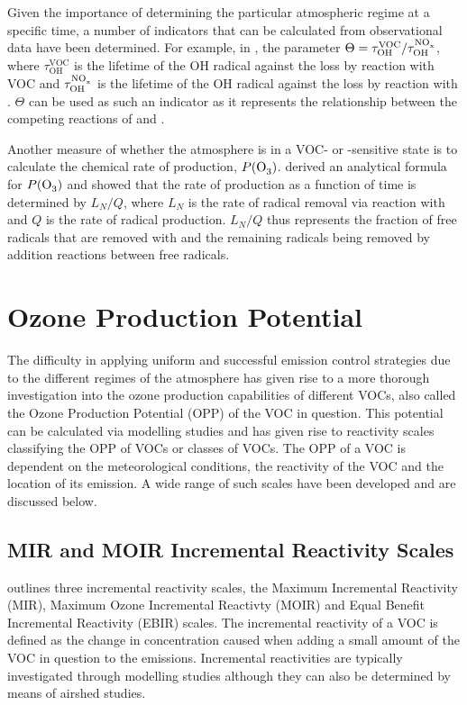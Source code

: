 Given the importance of determining the particular atmospheric regime at a specific time, a number of indicators that can be 
calculated from observational data have been determined. For example, in \citep{Kirchner:2001}, the parameter 
$\Theta = \tau^{\text{VOC}}_{\text{OH}} / \tau^{\ce{NO_x}}_{\text{OH}}$, where $\tau^{\text{VOC}}_{\text{OH}}$ is the lifetime 
of the OH radical against the loss by reaction with VOC and $\tau^{\ce{NO_x}}_{\text{OH}}$ is the lifetime of the OH radical 
against the loss by reaction with . $\Theta$ can be used as such an indicator as it represents the relationship 
between the competing reactions of  and .

Another measure of whether the atmosphere is in a VOC- or -sensitive state is to calculate the chemical rate of 
 production, $P(\ce{O3})$. \citep{Kleinman:2005} derived an analytical formula for $P(\ce{O3})$ and showed that the rate 
of  production as a function of time is determined by $L_N/Q$, where $L_N$ is the rate of radical removal via reaction 
with  and $Q$ is the rate of radical production. $L_N/Q$ thus represents the fraction of free radicals that are 
removed with  and the remaining radicals being removed by addition reactions between free radicals.

\section{Ozone Production Potential}
The difficulty in applying uniform and successful emission control strategies due to the different regimes of the atmosphere 
has given rise to a more thorough investigation into the ozone production capabilities of different VOCs, also called the Ozone
Production Potential (OPP) of the VOC in question. This potential can be calculated via modelling studies and has given rise to
reactivity scales classifying the OPP of VOCs or classes of VOCs. The OPP of a VOC is dependent on the meteorological 
conditions, the reactivity of the VOC and the location of its emission. A wide range of such scales have been developed and are
discussed below.

\subsection{MIR and MOIR Incremental Reactivity Scales} \label{s:MIR&MOIR}
\citep{Carter:1994} outlines three incremental reactivity scales, the Maximum Incremental Reactivity (MIR), Maximum Ozone 
Incremental Reactivty (MOIR) and Equal Benefit Incremental Reactivity (EBIR) scales. The incremental reactivity of a VOC is 
defined as the change in  concentration caused when adding a small amount of the VOC in question to the emissions. 
Incremental reactivities are typically investigated through modelling studies although they can also be determined by means of 
airshed studies. 

